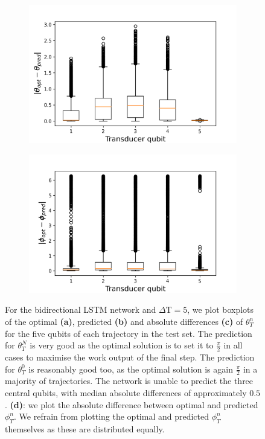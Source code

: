 \begin{figure}[h]
\begin{subfigure}{0.45\textwidth}
	\end{subfigure}
	\begin{subfigure}{0.45\textwidth}
		\centering
		\includegraphics[width=\textwidth]{img/delta_theta_box2}
	\end{subfigure}
\begin{subfigure}{0.45\textwidth}
	\centering
	\includegraphics[width=\textwidth]{img/delta_phi_box2}
\end{subfigure}
\caption{For the bidirectional LSTM network and $\Delta \mathrm{T} = 5$, we plot boxplots of the optimal \textbf{(a)}, predicted \textbf{(b)} and absolute differences \textbf{(c)} of $\theta^n_T$ for the five qubits of each trajectory in the test set. The prediction for $\theta_T^N$ is very good as the optimal solution is to set it to $\frac{\pi}{2}$ in all cases to maximise the work output of the final step. The prediction for $\theta_T^0$ is reasonably good too, as the optimal solution is again $\frac{\pi}{2}$ in a majority of trajectories. The network is unable to predict the three central qubits, with median absolute differences of approximately $0.5$. \textbf{(d)}: we plot the absolute difference between optimal and predicted $\phi_T^n$. We refrain from plotting the optimal and predicted $\phi_T^n$ themselves as these are distributed equally.}
\label{bilstmbox}
\end{figure}

\newpage